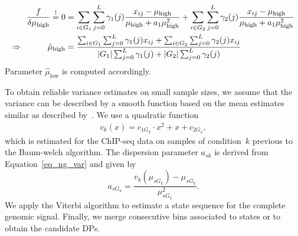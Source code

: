 \begin{align}
 \frac{f}{\delta \mu_{\text{high}} } \stackrel{!}{=} 0 &= \sum_{i \in G_1} \sum_{j=0}^L \gamma_1(j) \frac{x_{ij} - \mu_{\text{high}}}{\mu_{\text{high}} + a_{1} \mu_{\text{high}}^2} + \sum_{i \in G_2} \sum_{j=0}^L \gamma_2(j) \frac{x_{ij} - \mu_{\text{high}}}{\mu_{\text{high}} + a_{1} \mu_{\text{high}}^2} \notag \\
 \Rightarrow \quad \quad \quad \hat{\mu}_{\text{high}} &= \frac{\sum_{i \in G_1} \sum_{j=0}^L \gamma_1(j) x_{ij} + \sum_{i \in G_2} \sum_{j=0}^L \gamma_2(j) x_{ij}} {|G_1| \sum_{j=0}^L \gamma_1(j) + |G_2| \sum_{j=0}^L \gamma_2(j)} \notag
\end{align}
\noindent  Parameter $\hat{\mu}_{\text{low}}$ is computed accordingly.

\noindent
To obtain reliable variance estimates on small sample sizes, we assume that the variance can be described by a smooth function based on the mean estimates similar as described by~\cite{anders2010}. 
We use a quadratic function  
\begin{align}
 v_k(x) = c_{1G_k} \cdot x^2 + x + c_{2G_k}, \label{eq_quad_func}
\end{align}
\noindent
which is estimated for the ChIP-seq data on samples of condition~$k$ previous to the Baum-welch algorithm. 
The dispersion parameter $a_{sk}$ is derived from Equation~\ref{eq_ng_var} and given by 
$$a_{sG_k} = \frac{v_k(\mu_{sG_k})-\mu_{sG_k}}{\mu_{sG_k}^2}.$$
\noindent
We apply the Viterbi algorithm to estimate a state sequence for the complete genomic signal.
Finally, we merge consecutive bins associated to states  or  to obtain the candidate DPs.


